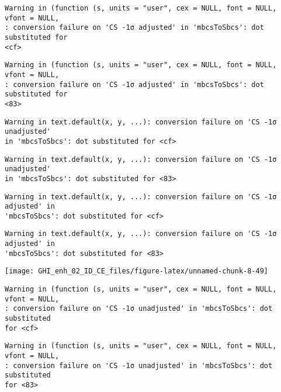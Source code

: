 \documentclass[
  10pt,
  a4paper,oneside]{article}
\begin{document}
\begin{verbatim}
Warning in (function (s, units = "user", cex = NULL, font = NULL, vfont = NULL,
: conversion failure on 'CS -1σ adjusted' in 'mbcsToSbcs': dot substituted for
<cf>
\end{verbatim}

\begin{verbatim}
Warning in (function (s, units = "user", cex = NULL, font = NULL, vfont = NULL,
: conversion failure on 'CS -1σ adjusted' in 'mbcsToSbcs': dot substituted for
<83>
\end{verbatim}

\begin{verbatim}
Warning in text.default(x, y, ...): conversion failure on 'CS -1σ unadjusted'
in 'mbcsToSbcs': dot substituted for <cf>
\end{verbatim}

\begin{verbatim}
Warning in text.default(x, y, ...): conversion failure on 'CS -1σ unadjusted'
in 'mbcsToSbcs': dot substituted for <83>
\end{verbatim}

\begin{verbatim}
Warning in text.default(x, y, ...): conversion failure on 'CS -1σ adjusted' in
'mbcsToSbcs': dot substituted for <cf>
\end{verbatim}

\begin{verbatim}
Warning in text.default(x, y, ...): conversion failure on 'CS -1σ adjusted' in
'mbcsToSbcs': dot substituted for <83>
\end{verbatim}

\begin{center}\texttt{[image: GHI\_enh\_02\_ID\_CE\_files/figure-latex/unnamed-chunk-8-49]} \end{center}

\begin{verbatim}
Warning in (function (s, units = "user", cex = NULL, font = NULL, vfont = NULL,
: conversion failure on 'CS -1σ unadjusted' in 'mbcsToSbcs': dot substituted
for <cf>
\end{verbatim}

\begin{verbatim}
Warning in (function (s, units = "user", cex = NULL, font = NULL, vfont = NULL,
: conversion failure on 'CS -1σ unadjusted' in 'mbcsToSbcs': dot substituted
for <83>
\end{verbatim}
\end{document}
